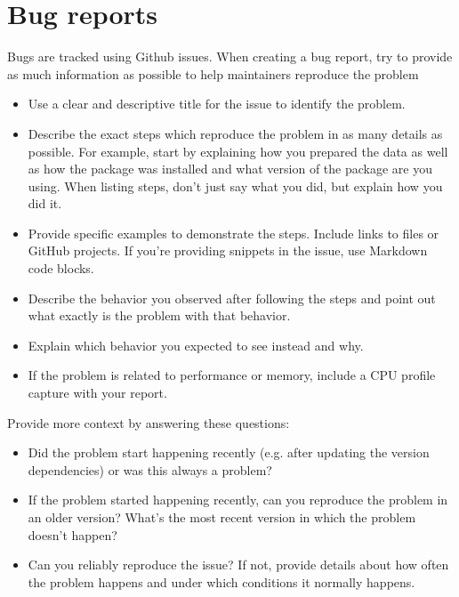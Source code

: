 \documentclass[letterpaper,10pt,english]{sphinxmanual}
\begin{document}
\section{Bug reports}
\label{\detokenize{package/contributors:bug-reports}}
Bugs are tracked using Github issues. When creating a bug report, try to provide as much information as possible to help maintainers
reproduce the problem
\begin{itemize}
\item {} 
Use a clear and descriptive title for the issue to identify the problem.

\item {} 
Describe the exact steps which reproduce the problem in as many details as possible. For example, start by explaining how you prepared the data as well as how the package was installed and what version of the package are you using. When listing steps, don’t just say what you did, but explain how you did it.

\item {} 
Provide specific examples to demonstrate the steps. Include links to files or GitHub projects. If you’re providing snippets in the issue, use Markdown code blocks.

\item {} 
Describe the behavior you observed after following the steps and point out what exactly is the problem with that behavior.

\item {} 
Explain which behavior you expected to see instead and why.

\item {} 
If the problem is related to performance or memory, include a CPU profile capture with your report.

\end{itemize}

Provide more context by answering these questions:
\begin{itemize}
\item {} 
Did the problem start happening recently (e.g. after updating the version dependencies) or was this always a problem?

\item {} 
If the problem started happening recently, can you reproduce the problem in an older version? What’s the most recent version in which the problem doesn’t happen?

\item {} 
Can you reliably reproduce the issue? If not, provide details about how often the problem happens and under which conditions it normally happens.

\end{itemize}
\end{document}

